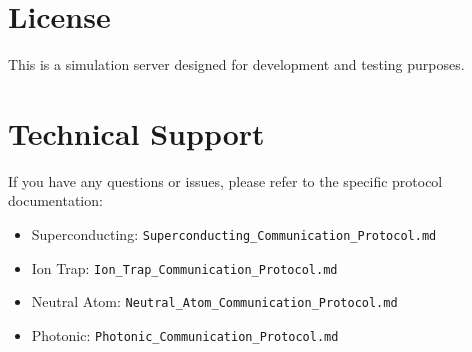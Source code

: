 \documentclass[UTF8, a4paper, 12pt]{article}
\begin{document}
\section{License}
This is a simulation server designed for development and testing purposes.

\section{Technical Support}
If you have any questions or issues, please refer to the specific protocol documentation:
\begin{itemize}
    \item Superconducting: \texttt{Superconducting\_Communication\_Protocol.md}
    \item Ion Trap: \texttt{Ion\_Trap\_Communication\_Protocol.md}
    \item Neutral Atom: \texttt{Neutral\_Atom\_Communication\_Protocol.md}
    \item Photonic: \texttt{Photonic\_Communication\_Protocol.md}
\end{itemize}
\end{document}
